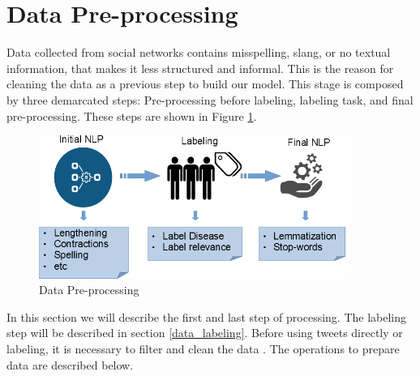 \documentclass[12pt]{report}
\begin{document}
\section{Data Pre-processing} \label{data_preprocessing}

Data collected from social networks contains misspelling, slang, or no textual information, that makes it less structured and informal. This is the reason for cleaning the data as a previous step to build our model. This stage is composed by three demarcated steps: Pre-processing before labeling, labeling task, and final pre-processing. These steps are shown in Figure \ref{figure:data_preprocessing}. 

\begin{figure}[H]	
	\centering
	\includegraphics[width=100mm, scale = 0.8]{images/9_data_preprocessing.png}	
	\caption{Data Pre-processing}	
	\label{figure:data_preprocessing}
\end{figure}

In this section we will describe the first and last step of processing. The labeling step will be described in section \ref{data_labeling}. Before using tweets directly or labeling, it is necessary to filter and clean the data \cite{Halibas2018,Dai2017,Ahuja2017}. The operations to prepare data are described below.
\end{document}
